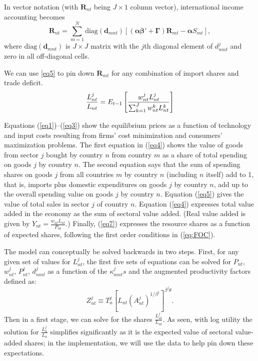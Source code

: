 \documentclass[12pt]{article}
\begin{document}
In vector notation (with $\mathbf R_{nt}$ being $J\times1$ column vector), international income accounting becomes
\begin{equation}\label{eq5}
	\mathbf R_{nt} =
		\sum_{m=1}^N 
			\text{diag}(\mathbf d_{mnt})
			[
				(\boldsymbol{\alpha\beta}'+\boldsymbol\Gamma)
				\mathbf R_{mt}
				- \boldsymbol\alpha S_{mt}
			],
\end{equation}
where $\text{diag}(\mathbf d_{mnt})$ is $J\times J$ matrix with the $j$th diagonal element of $d^j_{mnt}$ and zero in all off-diagonal cells. 

We can use \eqref{eq5} to pin down $\mathbf R_{mt}$ for any combination of import shares and trade deficit. 
\begin{equation}
\frac{L_{nt}^{j}}{L_{nt}}=E_{t-1}\left[ \frac{w_{nt}^{j}L_{nt}^{j}}{%
\sum_{k=1}^J w_{nt}^{k}L_{nt}^{k}}\right]  \label{eq7}
\end{equation}

Equations (\ref{eq1})--(\ref{eq3}) show the equilibrium prices as a function
of technology and input costs resulting from firms' cost minimization and
consumers' maximization problems. The first equation in (\ref{eq4}) shows
the value of goods from sector $j$ bought by country $n$ from country $m$ as
a share of total spending on goods $j$ by country $n.$ The second equation
says that the sum of spending shares on goods $j$ from all countries $m$ by
country $n$ (including $n$ itself) add to 1, that is, imports plus domestic
expenditures on goods $j$ by country $n$, add up to the overall spending
value on goods $j$ by country $n.$ Equation (\ref{eq5}) gives the value of
total sales in sector $j$ of country $n$. Equation (\ref{eq4})
expresses total value added in the economy as the sum of sectoral value
added. (Real value added is given by $Y_{nt}=\frac{w_{nt}L_{nt}}{P_{nt}}$.)
Finally, (\ref{eq7}) expresses the resource shares as a function of expected
shares, following the first order conditions in (\ref{eq:FOC}).

The model can conceptually be solved backwards in two steps. First, for any
given set of values for $L_{nt}^{j}$, the first five sets of equations can
be solved for $P_{nt}$, $w_{nt}^{j}$, $P_{nt}^{j}$, $d_{nmt}^{j}$ as a
function of the $\kappa _{mnt}^{j}s$ and the augmented productivity factors
defined as: 
\begin{equation}
Z_{nt}^{j}\equiv T_{n}^{j}\left[ L_{nt}\left( A_{nt}^{j}\right) ^{1/\beta
^{j}}\right] ^{\beta ^{j}\theta }.  \label{productivityfactor}
\end{equation}%
Then in a first stage, we can solve for the shares $\frac{L_{nt}^{j}}{L_{nt}}
$. As seen, with log utility the solution for $\frac{L_{n}^{j}}{L_{n}}$
simplifies significantly as it is the expected value of sectoral value-added
shares; in the implementation, we will use the data to help pin down these
expectations.
\end{document}
